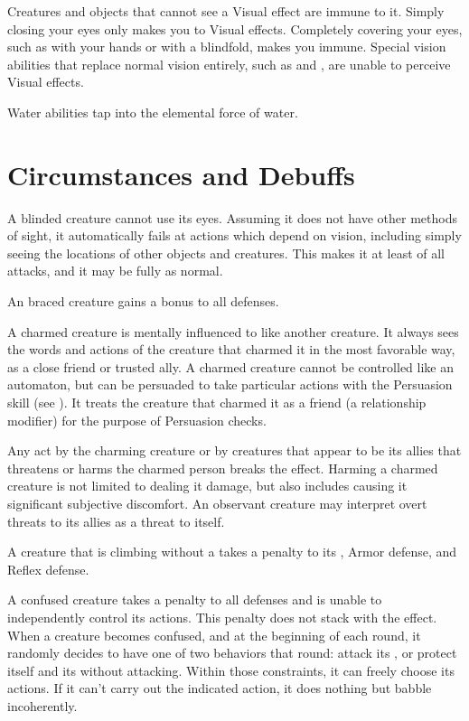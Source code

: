   Creatures and objects that cannot see a Visual effect are immune to it.
  Simply closing your eyes only makes you \impervious to Visual effects.
  Completely covering your eyes, such as with your hands or with a blindfold, makes you immune.
  Special vision abilities that replace normal vision entirely, such as  and , are unable to perceive Visual effects.

   Water abilities tap into the elemental force of water.

  \newpage
\section{Circumstances and Debuffs}\label{Circumstances and Debuffs}

   A blinded creature cannot use its eyes.
  Assuming it does not have other methods of sight, it automatically fails at actions which depend on vision, including simply seeing the locations of other objects and creatures.
  This makes it at least \partiallyunaware of all attacks, and it may be fully \unaware as normal.

   An braced creature gains a  bonus to all defenses.

   A charmed creature is mentally influenced to like another creature.
  It always sees the words and actions of the creature that charmed it in the most favorable way, as a close friend or trusted ally.
  A charmed creature cannot be controlled like an automaton, but can be persuaded to take particular actions with the Persuasion skill (see ).
  It treats the creature that charmed it as a friend (a  relationship modifier) for the purpose of Persuasion checks.

  Any act by the charming creature or by creatures that appear to be its allies that threatens or harms the charmed person breaks the effect.
  Harming a charmed creature is not limited to dealing it damage, but also includes causing it significant subjective discomfort.
  An observant creature may interpret overt threats to its allies as a threat to itself.

   A creature that is climbing without a  takes a  penalty to its , Armor defense, and Reflex defense.

   A confused creature takes a  penalty to all defenses and is unable to independently control its actions.
  This penalty does not stack with the \stunned effect.
  When a creature becomes confused, and at the beginning of each round, it randomly decides to have one of two behaviors that round: attack its , or protect itself and its  without attacking.
  Within those constraints, it can freely choose its actions.
  If it can't carry out the indicated action, it does nothing but babble incoherently.

